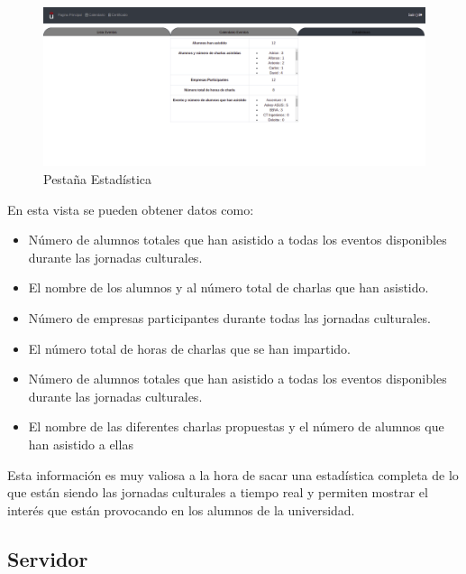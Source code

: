 \documentclass[a4paper, 12pt]{book}
\begin{document}
\begin{enumerate}
	\begin{figure}[h!]
  	\centering
  	\includegraphics[width=16cm, keepaspectratio]{img/adminEstadisticas.png}
  	\caption{Pestaña Estadística}\label{fig:adminEstadisticas}
	\end{figure}
	
	En esta vista se pueden obtener datos como:
		\begin{itemize}
  			\item Número de alumnos totales que han asistido a todas los eventos disponibles durante las jornadas culturales.
  			\item El nombre de los alumnos y al número total de charlas que han asistido.
  			\item Número de empresas participantes durante todas las jornadas culturales.
  			\item El número total de horas de charlas que se han impartido.
  			\item Número de alumnos totales que han asistido a todas los eventos disponibles durante las jornadas culturales.
  			\item El nombre de las diferentes charlas propuestas y el número de alumnos que han asistido a ellas
		\end{itemize}
		
	Esta información es muy valiosa a la hora de sacar una estadística completa de lo que están siendo las jornadas culturales a tiempo real y permiten mostrar el interés que están provocando en los alumnos de la universidad.

  
\end{enumerate}

\subsection{Servidor}
\end{document}
